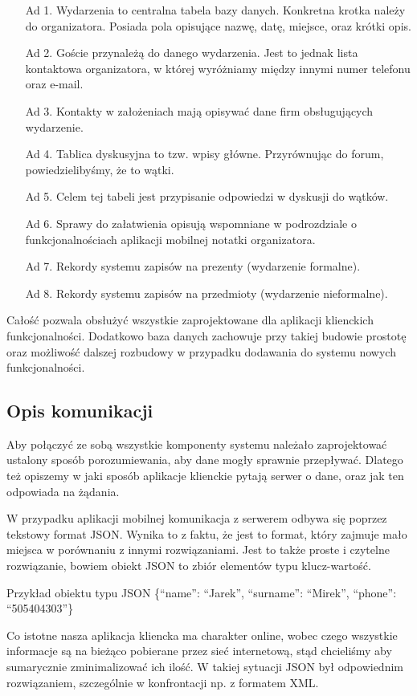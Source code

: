 \documentclass[12pt,titlepage]{article}
\begin{document}
\begin{itemize}
 \item[Ad 1.] Wydarzenia to centralna tabela bazy danych. Konkretna krotka należy do organizatora. Posiada pola opisujące nazwę, datę, miejsce, oraz krótki opis.
 \item[Ad 2.] Goście przynależą do danego wydarzenia. Jest to jednak lista kontaktowa organizatora, w której wyróżniamy między innymi numer telefonu oraz e-mail.
 \item[Ad 3.] Kontakty w założeniach mają opisywać dane firm obsługujących wydarzenie.
 \item[Ad 4.] Tablica dyskusyjna to tzw. wpisy główne. Przyrównując do forum, powiedzielibyśmy, że to wątki.
 \item[Ad 5.] Celem tej tabeli jest przypisanie odpowiedzi w dyskusji do wątków.
 \item[Ad 6.] Sprawy do załatwienia opisują wspomniane w podrozdziale o funkcjonalnościach aplikacji mobilnej notatki organizatora.
 \item[Ad 7.] Rekordy systemu zapisów na prezenty (wydarzenie formalne).
 \item[Ad 8.] Rekordy systemu zapisów na przedmioty (wydarzenie nieformalne).
\end{itemize}

Całość pozwala obsłużyć wszystkie zaprojektowane dla aplikacji klienckich funkcjonalności. Dodatkowo baza danych zachowuje przy takiej budowie prostotę oraz możliwość dalszej rozbudowy
w przypadku dodawania do systemu nowych funkcjonalności.

\subsection{Opis komunikacji} %
Aby połączyć ze sobą wszystkie komponenty systemu należało zaprojektować ustalony sposób porozumiewania, aby dane mogły sprawnie przepływać. Dlatego też opiszemy w jaki sposób aplikacje
klienckie pytają serwer o dane, oraz jak ten odpowiada na żądania.

W przypadku aplikacji mobilnej komunikacja z serwerem odbywa się poprzez tekstowy format JSON. Wynika to z faktu, że jest to format, który zajmuje mało miejsca w porównaniu z innymi rozwiązaniami.
Jest to także proste i czytelne rozwiązanie, bowiem obiekt JSON to zbiór elementów typu klucz-wartość.
\begin{beamerlikethm}{Przykład obiektu typu JSON}
\{``name'': ``Jarek'', ``surname'': ``Mirek'', ``phone'': ``505404303''\}
\end{beamerlikethm}
Co istotne nasza aplikacja kliencka ma charakter online, wobec czego wszystkie informacje są na bieżąco pobierane przez sieć internetową, stąd chcieliśmy aby sumarycznie zminimalizować ich ilość.
W takiej sytuacji JSON był odpowiednim rozwiązaniem, szczególnie w konfrontacji np. z formatem XML.
\end{document}
